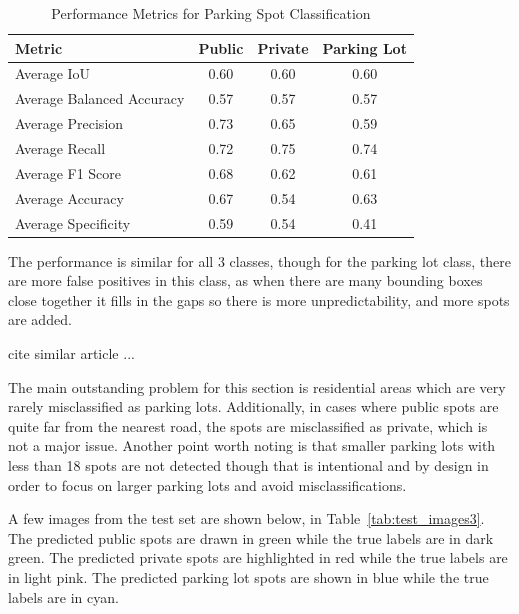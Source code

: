 \begin{table}[htbp]
  \centering
  \begin{tabular}{|l|c|c|c|}
    \hline
    \textbf{Metric}           & \textbf{Public} & \textbf{Private} & \textbf{Parking Lot} \\ \hline
    Average IoU               & 0.60            & 0.60             & 0.60                 \\ \hline
    Average Balanced Accuracy & 0.57            & 0.57             & 0.57                 \\ \hline
    Average Precision         & 0.73            & 0.65             & 0.59                 \\ \hline
    Average Recall            & 0.72            & 0.75             & 0.74                 \\ \hline
    Average F1 Score          & 0.68            & 0.62             & 0.61                 \\ \hline
    Average Accuracy          & 0.67            & 0.54             & 0.63                 \\ \hline
    Average Specificity       & 0.59            & 0.54             & 0.41                 \\ \hline
  \end{tabular}
  \caption{Performance Metrics for Parking Spot Classification}
  \label{tab:metrics3}
\end{table}

The performance is similar for all 3 classes, though for the parking lot class, there are more false positives in this class, as when there are many bounding boxes close together it fills in the gaps so there is more unpredictability, and more spots are added.

cite similar article ...

The main outstanding problem for this section is residential areas which are very rarely misclassified as parking lots.
Additionally, in cases where public spots are quite far from the nearest road, the spots are misclassified as private, which is not a major issue.
Another point worth noting is that smaller parking lots with less than 18 spots are not detected though that is intentional and by design in order to focus on larger parking lots and avoid misclassifications.

A few images from the test set are shown below, in Table~\ref{tab:test_images3}.
The predicted public spots are drawn in green while the true labels are in dark green. The predicted private spots are highlighted in red while the true labels are in light pink. The predicted parking lot spots are shown in blue while the true labels are in cyan.

